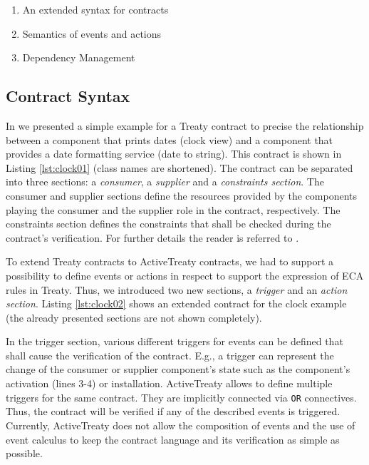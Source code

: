 \documentclass{llncs}
\begin{document}

\begin{enumerate}
  \item An extended syntax for contracts
  \item Semantics of events and actions
  \item Dependency Management
\end{enumerate}


\subsection{Contract Syntax}

In \cite{Treaty.JOT2009} we presented a simple example for a Treaty contract to precise the relationship between a component that prints
dates (clock view) and a component that provides a date formatting service (date to string). This contract is shown in Listing \ref{lst:clock01} (class names are shortened). The contract can be separated into three sections: a \textit{consumer}, a \textit{supplier} and a \textit{constraints section}. The consumer and supplier sections define the resources provided by the components playing the consumer and the supplier role in the contract, respectively. The constraints section defines the constraints that shall be checked during the contract's verification. For further details the reader is referred to \cite{Treaty.JOT2009}.

\begin{figure}[htbp]
\lstset{ 
  language=XML,
  caption=A contract for the clock example.,
  label=lst:clock01
}

\end{figure}

To extend Treaty contracts to ActiveTreaty contracts, we had to support a possibility to define events or actions in respect to support the expression of ECA rules in Treaty. Thus, we introduced two new sections, a \textit{trigger} and an \textit{action section}. Listing \ref{lst:clock02} shows an extended contract for the clock example (the already presented sections are not shown completely).

\begin{figure}[htbp]
\lstset{ 
  language=XML,
  caption=A contract for the clock example including triggers and actions.,
  label=lst:clock02
}

\end{figure}

In the trigger section, various different triggers for events can be defined that shall cause the verification of the contract. E.g., a trigger can represent the change of the consumer or supplier component's state such as the component's activation (lines 3-4) or installation. ActiveTreaty allows to define multiple triggers for the same contract. They are implicitly connected via \texttt{OR} connectives. Thus, the contract will be verified if any of the described events is triggered. Currently, ActiveTreaty does not allow the composition of events and the use of event calculus to keep the contract language and its verification as simple as possible.
\end{document}
